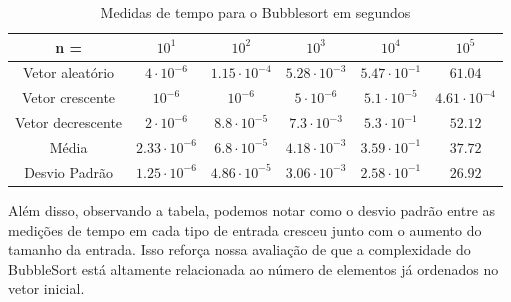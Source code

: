 \documentclass{article}
\begin{document}
\begin{table}[h]
    \begin{tabular}{c|c|c|c|c|c}
        n = & $10^{1}$ & $10^{2}$ & $10^{3}$ & $10^{4}$ & $10^{5}$ \\ 
        \hline
        Vetor aleatório & $4\cdot 10^{-6}$ & $1.15\cdot 10^{-4}$ & $5.28\cdot 10^{-3}$ & $5.47\cdot 10^{-1}$ & $61.04$ \\
        \hline
        Vetor crescente & $10^{-6}$ & $10^{-6}$ & $5\cdot 10^{-6}$ & $5.1\cdot 10^{-5}$ & $4.61\cdot 10^{-4}$\\
        \hline
        Vetor decrescente & $2\cdot10^{-6}$ & $8.8\cdot10^{-5}$ & $7.3\cdot 10^{-3}$ & $5.3\cdot 10^{-1}$ & $52.12$\\
        \hline
        Média & $2.33\cdot 10^{-6}$ & $6.8\cdot 10^{-5}$ & $4.18\cdot 10^{-3}$ & $3.59\cdot 10^{-1}$ & $37.72$ \\
        \hline
        Desvio Padrão & $1.25\cdot 10^{-6}$ & $4.86\cdot 10^{-5}$ & $3.06\cdot 10^{-3}$ & $2.58\cdot 10^{-1}$ & $26.92$ \\
    \end{tabular}
    \caption{Medidas de tempo para o Bubblesort em segundos}
\end{table}\par
Além disso, observando a tabela, podemos notar como o desvio padrão entre as medições de tempo em cada tipo de entrada cresceu junto com o aumento do tamanho da entrada. Isso reforça nossa avaliação de que a complexidade do BubbleSort está altamente relacionada ao número de elementos já ordenados no vetor inicial.
\end{document}
